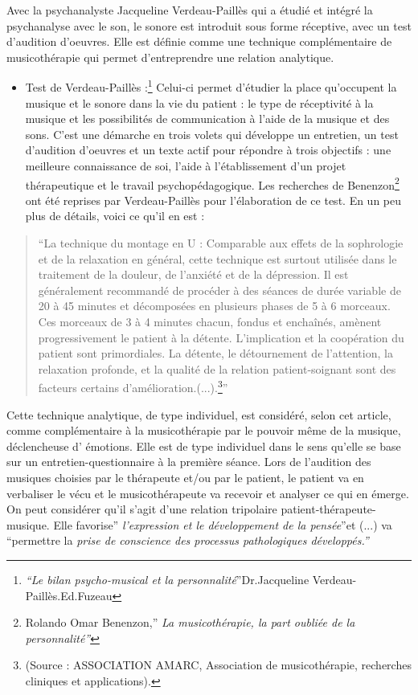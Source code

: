 Avec la psychanalyste Jacqueline Verdeau-Paillès qui a étudié et intégré
la psychanalyse avec le son, le sonore est introduit sous forme réceptive,
avec un test d'audition d'oeuvres. Elle est définie comme une technique
complémentaire de musicothérapie qui permet d\textquoteright entreprendre
une relation analytique. 
\begin{itemize}
\item Test de Verdeau-Paillès :\footnote{\emph{``Le bilan psycho-musical et la personnalité}''Dr.Jacqueline
Verdeau-Paillès.Ed.Fuzeau} Celui-ci permet d'étudier la place qu'occupent la musique et le sonore
dans la vie du patient : le type de réceptivité à la musique et les
possibilités de communication à l'aide de la musique et des sons.
C'est une démarche en trois volets qui développe un entretien, un
test d'audition d'oeuvres et un texte actif pour répondre à trois
objectifs : une meilleure connaissance de soi, l'aide à l'établissement
d'un projet thérapeutique et le travail psychopédagogique. Les recherches
de Benenzon\footnote{Rolando Omar Benenzon,'' \emph{La musicothérapie, la part oubliée
de la personnalité''}} ont été reprises par Verdeau-Paillès pour l'élaboration de ce test.
En un peu plus de détails, voici ce qu'il en est :
\end{itemize}
\begin{quotation}
``La technique du montage en U : Comparable aux effets de la sophrologie
et de la relaxation en général, cette technique est surtout utilisée
dans le traitement de la douleur, de l\textquoteright anxiété et de
la dépression. Il est généralement recommandé de procéder à des séances
de durée variable de 20 à 45 minutes et décomposées en plusieurs phases
de 5 à 6 morceaux. Ces morceaux de 3 à 4 minutes chacun, fondus et
enchaînés, amènent progressivement le patient à la détente. L\textquoteright implication
et la coopération du patient sont primordiales. La détente, le détournement
de l\textquoteright attention, la relaxation profonde, et la qualité
de la relation patient-soignant sont des facteurs certains d\textquoteright amélioration.(...).\footnote{(Source : ASSOCIATION AMARC, Association de musicothérapie, recherches
cliniques et applications).}''
\end{quotation}
Cette technique analytique, de type individuel, est considéré, selon
cet article, comme complémentaire à la musicothérapie par le pouvoir
même de la musique, déclencheuse d' émotions. Elle est de type individuel
dans le sens qu'elle se base sur un entretien-questionnaire à la première
séance. Lors de l'audition des musiques choisies par le thérapeute
et/ou par le patient, le patient va en verbaliser le vécu et le musicothérapeute
va recevoir et analyser ce qui en émerge. On peut considérer qu'il
s'agit d'une relation tripolaire patient-thérapeute-musique. Elle
favorise''\emph{ l\textquoteright expression et le développement
de la pensée}''et (...) va ``permettre la \emph{prise de conscience
des processus pathologiques développés.'' }

